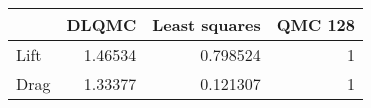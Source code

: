 \begin{tabular}{lrrr}
\toprule
      &   DLQMC &   Least squares &   QMC 128 \\
\midrule
 Lift & 1.46534 &        0.798524 &         1 \\
 Drag & 1.33377 &        0.121307 &         1 \\
\bottomrule
\end{tabular}
